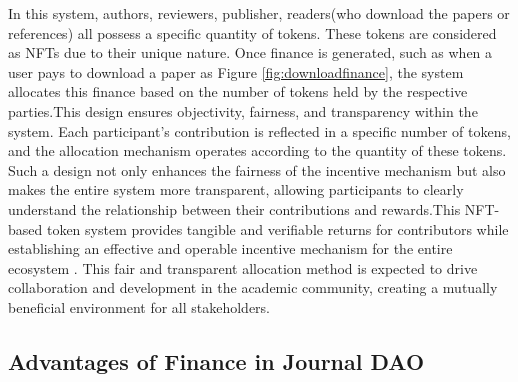 \documentclass[lettersize,journal]{IEEEtran}
\begin{document}
In this system, authors, reviewers, publisher, readers(who download the papers or references) all possess a specific quantity of tokens. These tokens are considered as NFTs due to their unique nature. Once finance is generated, such as when a user pays to download a paper as Figure \ref{fig:downloadfinance}, the system allocates this finance based on the number of tokens held by the respective parties.This design ensures objectivity, fairness, and transparency within the system. Each participant's contribution is reflected in a specific number of tokens, and the allocation mechanism operates according to the quantity of these tokens. Such a design not only enhances the fairness of the incentive mechanism but also makes the entire system more transparent, allowing participants to clearly understand the relationship between their contributions and rewards.This NFT-based token system provides tangible and verifiable returns for contributors while establishing an effective and operable incentive mechanism for the entire ecosystem \cite{kong2021alternative}. This fair and transparent allocation method is expected to drive collaboration and development in the academic community, creating a mutually beneficial environment for all stakeholders.




\subsection{Advantages of Finance in Journal DAO}
\end{document}
